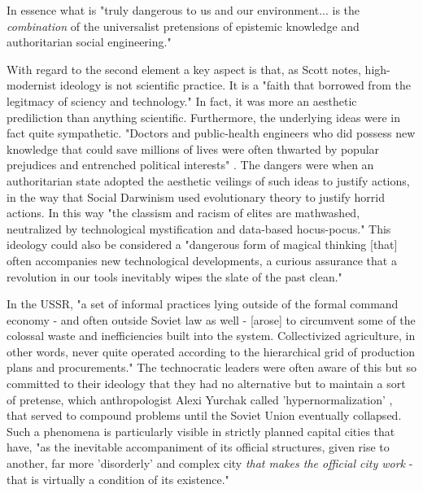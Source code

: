 In essence what is "truly dangerous to us and our environment... is the \textit{combination} of the universalist pretensions of epistemic knowledge and authoritarian social engineering." \cite{scottSeeingStateHow2020}

With regard to the second element a key aspect is that, as Scott notes, high-modernist ideology is not scientific practice. It is a "faith that borrowed from the legitmacy of sciency and technology." In fact, it was more an aesthetic prediliction than anything scientific. Furthermore, the underlying ideas were in fact quite sympathetic. "Doctors and public-health engineers who did possess new knowledge that could save millions of lives were often thwarted by popular prejudices and entrenched political interests"  \cite{scottSeeingStateHow2020}. The dangers were when an authoritarian state adopted the aesthetic veilings of such ideas to justify actions, in the way that Social Darwinism used evolutionary theory to justify horrid actions. In this way "the classism and racism of elites are mathwashed, neutralized by technological mystification and data-based hocus-pocus." \cite{eubanksAutomatingInequalityHow2018} This ideology could also be considered a "dangerous form of magical thinking [that] often accompanies new technological developments, a curious assurance that a revolution in our tools inevitably wipes the slate of the past clean." \cite{eubanksAutomatingInequalityHow2018}


In the USSR, "a set of informal practices lying outside of the formal command economy - and often outside Soviet law as well - [arose] to circumvent some of the colossal waste and inefficiencies built into the system. Collectivized agriculture, in other words, never quite operated according to the hierarchical grid of production plans and procurements." \cite{scottSeeingStateHow2020} The technocratic leaders were often aware of this but so committed to their ideology that they had no alternative but to maintain a sort of pretense, which anthropologist Alexi Yurchak called 'hypernormalization' \cite{yurchakEverythingWasForever2005}, that served to compound problems until the Soviet Union eventually collapsed. Such a phenomena is particularly visible in strictly planned capital cities that have, "as the inevitable accompaniment of its official structures, given rise to another, far more 'disorderly' and complex city \textit{that makes the official city work} - that is virtually a condition of its existence." \cite{scottSeeingStateHow2020}



